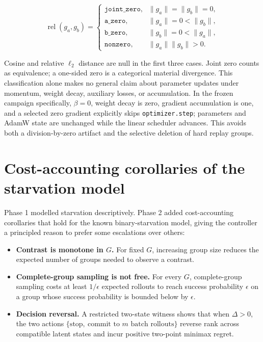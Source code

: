 \begin{equation}
\operatorname{rel}(g_a,g_b)=
\begin{cases}
  \texttt{joint\_zero}, & \lVert g_a\rVert=\lVert g_b\rVert=0,\\
  \texttt{a\_zero}, & \lVert g_a\rVert=0<\lVert g_b\rVert,\\
  \texttt{b\_zero}, & \lVert g_b\rVert=0<\lVert g_a\rVert,\\
  \texttt{nonzero}, & \lVert g_a\rVert\lVert g_b\rVert>0.
\end{cases}
\label{eq:gradient-relation}
\end{equation}

Cosine and relative $\ell_2$ distance are null in the first three cases. Joint
zero counts as equivalence; a one-sided zero is a categorical material
divergence. This classification alone makes no general claim about parameter
updates under momentum, weight decay, auxiliary losses, or accumulation. In the
frozen campaign specifically, $\beta=0$, weight decay is zero, gradient
accumulation is one, and a selected zero gradient explicitly skips
\texttt{optimizer.step}; parameters and AdamW state are unchanged while the
linear scheduler advances. This avoids both a division-by-zero artifact and the
selective deletion of hard replay groups.

\section{Cost-accounting corollaries of the starvation model}

Phase 1 modelled starvation descriptively. Phase 2 added cost-accounting
corollaries that hold for the known binary-starvation model, giving the
controller a principled reason to prefer some escalations over others:

\begin{itemize}[leftmargin=1.4em,itemsep=2pt]
  \item \textbf{Contrast is monotone in $G$.} For fixed $G$, increasing group size
  reduces the expected number of groups needed to observe a contrast.
  \item \textbf{Complete-group sampling is not free.} For every $G$,
  complete-group sampling costs at least $1/\epsilon$ expected rollouts to reach
  success probability $\epsilon$ on a group whose success probability is bounded
  below by $\epsilon$.
  \item \textbf{Decision reversal.} A restricted two-state witness shows that when
  $\Delta>0$, the two actions $\{\text{stop},\ \text{commit to }m\text{ batch
  rollouts}\}$ reverse rank across compatible latent states and incur positive
  two-point minimax regret.
\end{itemize}


